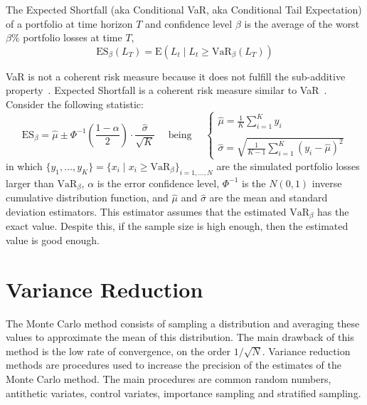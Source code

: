 \documentclass[11pt,fleqn]{book} %
\begin{document}
\begin{definition}
	The Expected Shortfall (aka Conditional VaR, aka Conditional Tail 
	Expectation) of a portfolio at time horizon $T$ and 
	confidence level $\beta$ is the average of the worst $\beta\%$ portfolio 
	losses at time $T$,
	\begin{displaymath}
		\text{ES}_\beta(L_T) = \text{E}(L_t \mid L_t \ge \text{VaR}_\beta(L_T))
	\end{displaymath}
\end{definition}

VaR is not a coherent risk measure because it does not fulfill the 
sub-additive property~\cite{var:varbad}. Expected Shortfall is a coherent 
risk measure similar to VaR~\cite{var:eshortfall}. Consider the following
statistic:
\begin{displaymath}
	\text{ES}_{\beta} = \widehat{\mu} \pm \Phi^{-1}\left(\frac{1-\alpha}{2}\right) \cdot \frac{\widehat{\sigma}}{\sqrt{K}}
	\quad \text{ being } \quad
	\left\{
	\begin{array}{l}
		\displaystyle
		\widehat{\mu} = \frac{1}{K} \sum_{i=1}^{K} y_i \\
		\\
		\displaystyle
		\widehat{\sigma} =
		\sqrt{\frac{1}{K-1} \sum_{i=1}^{K} \left( y_i - \widehat{\mu} \right)^2}
	\end{array}
	\right.
\end{displaymath}
in which 
$\{y_1, \ldots, y_K\} = \{x_i \mid x_i \ge \text{VaR}_{\beta} \}_{i=1,\dots,N}$ 
are the simulated portfolio losses larger than $\text{VaR}_{\beta}$, 
$\alpha$ is the error confidence level, $\Phi^{-1}$ is the $N(0,1)$ 
inverse cumulative distribution function, and $\widehat{\mu}$ and 
$\widehat{\sigma}$ are the mean and standard deviation estimators.
This estimator assumes that the estimated $\text{VaR}_{\beta}$ has the 
exact value. Despite this, if the sample size is high enough, then the 
estimated value is good enough.

\section{Variance Reduction}

The Monte Carlo method consists of sampling a distribution and averaging 
these values to approximate the mean of this distribution. The main drawback 
of this method is the low rate of convergence, on the order $1/\sqrt{N}$.
Variance reduction methods are procedures used to increase the precision 
of the estimates of the Monte Carlo method. The main procedures are common 
random numbers, antithetic variates, control variates, importance sampling 
and stratified sampling.
\end{document}
